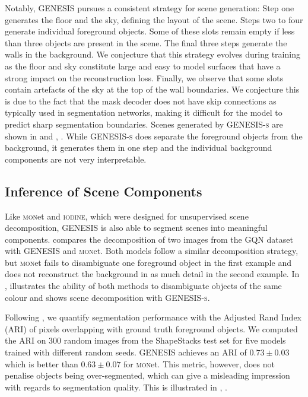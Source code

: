 \documentclass{article}
\begin{document}
Notably, \gls{GENESIS} pursues a consistent strategy for scene generation:
Step one generates the floor and the sky, defining the layout of the scene.
Steps two to four generate individual foreground objects.
Some of these slots remain empty if less than three objects are present in the scene.
The final three steps  generate the walls in the background.
We conjecture that this strategy evolves during training as the floor and sky constitute large and easy to model surfaces that have a strong impact on the reconstruction loss.
Finally, we observe that some slots contain artefacts of the sky at the top of the wall boundaries.
We conjecture this is due to the fact that the mask decoder does not have skip connections as typically used in segmentation networks, making it difficult for the model to predict sharp segmentation boundaries.
Scenes generated by \gls{GENESIS}\textsc{-s} are shown in  and , . While \gls{GENESIS}\textsc{-s} does separate the foreground objects from the background, it generates them in one step and the individual background components are not very interpretable.




\clearpage

\subsection{Inference of Scene Components}

Like \textsc{mon}et and \textsc{iodine}, which were designed for unsupervised scene decomposition, \gls{GENESIS} is also able to segment scenes into meaningful components.
 compares the decomposition of two images from the GQN dataset with \gls{GENESIS} and \textsc{mon}et.
Both models follow a similar decomposition strategy, but \textsc{mon}et fails to disambiguate one foreground object in the first example and does not reconstruct the background in as much detail in the second example.
In ,  illustrates the ability of both methods to disambiguate objects of the same colour and  shows scene decomposition with \gls{GENESIS}\textsc{-s}.

Following \citet{greff2019multi}, we quantify segmentation performance with the Adjusted Rand Index (ARI) of pixels overlapping with ground truth foreground objects.
We computed the ARI on 300 random images from the ShapeStacks test set for five models trained with different random seeds.
\mbox{\gls{GENESIS}} achieves an ARI of $0.73\pm0.03$ which is better than $0.63\pm0.07$ for \textsc{mon}et.
This metric, however, does not penalise objects being over-segmented, which can give a misleading impression with regards to segmentation quality.
This is illustrated in , .
\end{document}
